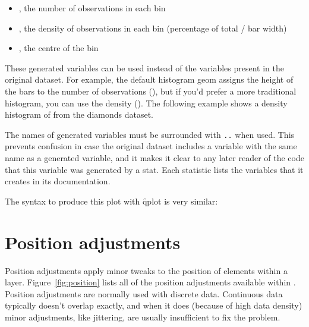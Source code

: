 \begin{itemize}
  \item {}, the number of observations in each bin
  \item {}, the density of observations in each bin (percentage of total / bar width)
  \item {}, the centre of the bin
\end{itemize}

These generated variables can be used instead of the variables present in the original dataset.  For example, the default histogram geom assigns the height of the bars to the number of observations (), but if you'd prefer a more traditional histogram, you can use the density ().   The following example shows a density histogram of  from the diamonds dataset.

% 


The names of generated variables must be surrounded with {\tt ..} when used.  This prevents confusion in case the original dataset includes a variable with the same name as a generated variable, and it makes it clear to any later reader of the code that this variable was generated by a stat.  Each statistic lists the variables that it creates in its documentation.

The syntax to produce this plot with \f{qplot} is very similar:

% 


\section{Position adjustments}
\label{sec:position}

Position adjustments apply minor tweaks to the position of elements within a layer.  Figure~\ref{fig:position} lists all of the position adjustments available within \ggplot.  Position adjustments are normally used with discrete data.  Continuous data typically doesn't overlap exactly, and when it does (because of high data density) minor adjustments, like jittering, are usually insufficient to fix the problem.

